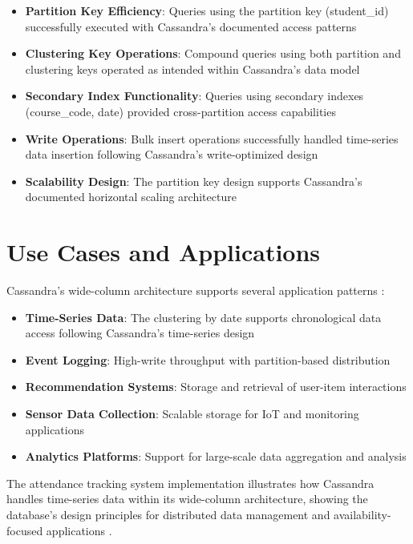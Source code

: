 \begin{itemize}
    \item \textbf{Partition Key Efficiency}: Queries using the partition key (student\_id) successfully executed with Cassandra's documented access patterns \parencite{cassandra_documentation}
    \item \textbf{Clustering Key Operations}: Compound queries using both partition and clustering keys operated as intended within Cassandra's data model \parencite{cassandra_architecture}
    \item \textbf{Secondary Index Functionality}: Queries using secondary indexes (course\_code, date) provided cross-partition access capabilities \parencite{cassandra_documentation}
    \item \textbf{Write Operations}: Bulk insert operations successfully handled time-series data insertion following Cassandra's write-optimized design \parencite{cassandra_architecture}
    \item \textbf{Scalability Design}: The partition key design supports Cassandra's documented horizontal scaling architecture \parencite{cassandra_documentation}
\end{itemize}

\section{Use Cases and Applications}

Cassandra's wide-column architecture supports several application patterns \parencite{cassandra_architecture}:

\begin{itemize}
    \item \textbf{Time-Series Data}: The clustering by date supports chronological data access following Cassandra's time-series design \parencite{cassandra_documentation}
    \item \textbf{Event Logging}: High-write throughput with partition-based distribution \parencite{cassandra_architecture}
    \item \textbf{Recommendation Systems}: Storage and retrieval of user-item interactions \parencite{cassandra_documentation}
    \item \textbf{Sensor Data Collection}: Scalable storage for IoT and monitoring applications \parencite{cassandra_architecture}
    \item \textbf{Analytics Platforms}: Support for large-scale data aggregation and analysis \parencite{cassandra_documentation}
\end{itemize}

The attendance tracking system implementation illustrates how Cassandra handles time-series data within its wide-column architecture, showing the database's design principles for distributed data management and availability-focused applications \parencite{cassandra_architecture}.